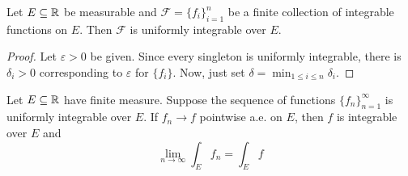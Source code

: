 \begin{proposition}
    Let $E\subseteq\mathbb{R}$ be measurable and $\mathcal F = \{f_i\}_{i = 1}^n$ be a finite collection of integrable functions on $E$. Then $\mathcal F$ is uniformly integrable over $E$.
\end{proposition}
\begin{proof}
    Let $\varepsilon > 0$ be given. Since every singleton is uniformly integrable, there is $\delta_i > 0$ corresponding to $\varepsilon$ for $\{f_i\}$. Now, just set $\delta = \min_{1\le i\le n}\delta_i$.
\end{proof}

\begin{theorem}
    Let $E\subseteq\mathbb{R}$ have finite measure. Suppose the sequence of functions $\{f_n\}_{n = 1}^\infty$ is uniformly integrable over $E$. If $f_n\to f$ pointwise a.e. on $E$, then $f$ is integrable over $E$ and 
    \begin{equation*}
        \lim_{n\to\infty}\int_E f_n = \int_E f
    \end{equation*}
\end{theorem}

